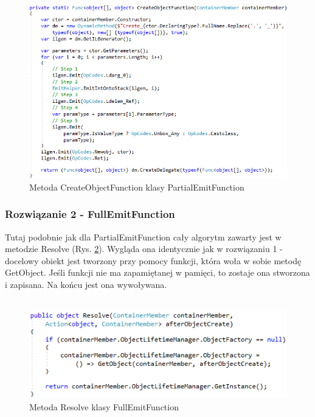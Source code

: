 \documentclass[12pt]{article}
\begin{document}
\begin{figure}[H]
	\begin{center}
  		\includegraphics{PartialEmitFunction_CreateObjectFunction.png}
  		\caption{Metoda CreateObjectFunction klasy PartialEmitFunction}
  		\label{fig:PartialEmitFunction_CreateObjectFunction}
	\end{center}
\end{figure}

\subsubsection{Rozwiązanie 2 - FullEmitFunction}
Tutaj podobnie jak dla PartialEmitFunction cały algorytm zawarty jest w metodzie Resolve (Rys. \ref{fig:FullEmitFunction_Resolve}). Wygląda ona identycznie jak w rozwiązaniu 1 - docelowy obiekt jest tworzony przy pomocy funkcji, która woła w sobie metodę GetObject. Jeśli funkcji nie ma zapamiętanej w pamięci, to zostaje ona stworzona i zapisana. Na końcu jest ona wywoływana.\\ \\
\begin{figure}[H]
	\begin{center}
  		\includegraphics{FullEmitFunction_Resolve.png}
  		\caption{Metoda Resolve klasy FullEmitFunction}
  		\label{fig:FullEmitFunction_Resolve}
	\end{center}
\end{figure}
\end{document}
